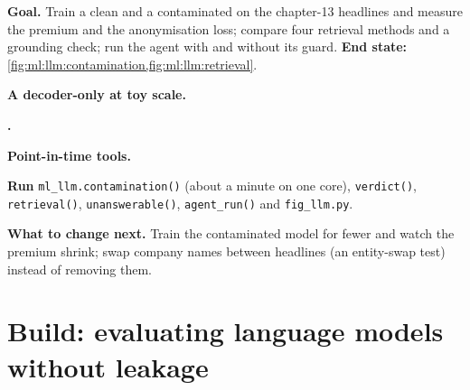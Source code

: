 \begin{tutorial}
\textbf{Goal.} Train a clean and a contaminated  on the chapter-13 headlines and measure the 
premium and the anonymisation loss; compare four retrieval methods and a grounding check; run the agent with and without its
guard. \textbf{End state:} \cref{fig:ml:llm:contamination,fig:ml:llm:retrieval}.
\begin{tutsteps}
\item \textbf{A decoder-only  at toy scale.}
\label{lst:ml:llm:tinylm}
\item \textbf{.}
\label{lst:ml:llm:bm25}
\item \textbf{Point-in-time tools.}
\label{lst:ml:llm:tools}
\item \textbf{Run} \texttt{ml\_llm.contamination()} (about a minute on one core), \texttt{verdict()}, \texttt{retrieval()},
\texttt{unanswerable()}, \texttt{agent\_run()} and \texttt{fig\_llm.py}.
\end{tutsteps}
\textbf{What to change next.} Train the contaminated model for fewer  and watch the premium shrink; swap company names
between headlines (an entity-swap test) instead of removing them.
\end{tutorial}

\section{Build: evaluating language models without leakage}\label{bld:ml:large-language-models-in-finance:llmeval}

